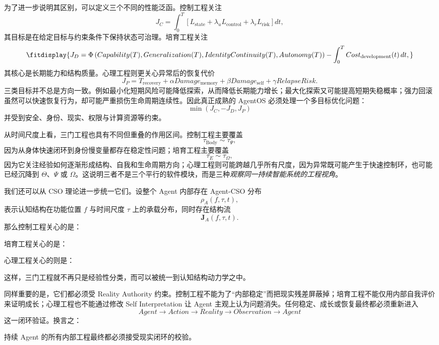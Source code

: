 为了进一步说明其区别，可以定义三个不同的性能泛函。控制工程关注
\[
J_C
=
\int_{0}^{T}
\left[
L_{\mathrm{state}}
+
\lambda_u L_{\mathrm{control}}
+
\lambda_r L_{\mathrm{risk}}
\right]dt,
\]
其目标是在给定目标与约束条件下保持状态可治理。培育工程关注
\[
\fitdisplay{
J_D
=
\Phi
\left(
Capability(T),
Generalization(T),
IdentityContinuity(T),
Autonomy(T)
\right)
-
\int_{0}^{T}
Cost_{\mathrm{development}}(t)\,dt,
}
\]
其核心是长期能力和结构质量。心理工程则更关心异常后的恢复代价
\[
J_P
=
T_{\mathrm{recovery}}
+
\alpha
Damage_{\mathrm{memory}}
+
\beta
Damage_{\mathrm{self}}
+
\gamma
RelapseRisk.
\]
三类目标并不总是方向一致。例如最小化短期风险可能降低探索，从而降低长期能力增长；最大化探索又可能提高短期失稳概率；强力回滚虽然可以快速恢复行为，却可能严重损伤生命周期连续性。因此真正成熟的 AgentOS 必须处理一个多目标优化问题：
\[
\boxed{
\min
\left(
J_C,
-J_D,
J_P
\right)
}
\]
并受到安全、身份、现实、权限与计算资源等约束。

从时间尺度上看，三门工程也具有不同但重叠的作用区间。控制工程主要覆盖
\[
\tau_{\mathrm{Body}}
\sim
\tau_{\Psi},
\]
因为从身体快速闭环到身份慢变量都存在稳定性问题；培育工程主要覆盖
\[
\tau_E
\sim
\tau_{\Omega},
\]
因为它关注经验如何逐渐形成结构、自我和生命周期方向；心理工程则可能跨越几乎所有尺度，因为异常既可能产生于快速控制环，也可能已经沉降到 $\Theta$、$\Psi$ 或 $\Omega$。这说明三者不是三个平行的软件模块，而是三种\emph{观察同一持续智能系统的工程视角}。

我们还可以从 CSO 理论进一步统一它们。设整个 Agent 内部存在 Agent-CSO 分布
\[
\rho_{A}(f,\tau,t),
\]
表示认知结构在功能位置 $f$ 与时间尺度 $\tau$ 上的承载分布，同时存在结构流
\[
\mathbf J_A(f,\tau,t).
\]
那么控制工程关心的是：
\begin{statementbox}
\centering
{}
\end{statementbox}
培育工程关心的是：
\begin{statementbox}
\centering
{}
\end{statementbox}
心理工程关心的则是：
\begin{statementbox}
\centering
{}
\end{statementbox}
这样，三门工程就不再只是经验性分类，而可以被统一到认知结构动力学之中。

同样重要的是，它们都必须受 Reality Authority 约束。控制工程不能为了“内部稳定”而把现实残差屏蔽掉；培育工程不能仅用内部自我评价来证明成长；心理工程也不能通过修改 Self Interpretation 让 Agent 主观上认为问题消失。任何稳定、成长或恢复最终都必须重新进入
\[
Agent
\rightarrow
Action
\rightarrow
Reality
\rightarrow
Observation
\rightarrow
Agent
\]
这一闭环验证。换言之：
\begin{statementbox}
\centering
{}
\end{statementbox}
持续 Agent 的所有内部工程最终都必须接受现实闭环的校验。

